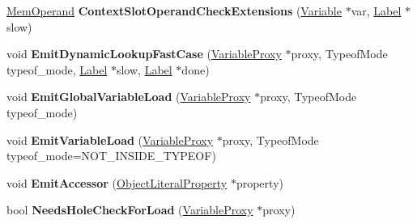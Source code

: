 \begin{DoxyCompactItemize}
\item 
\hyperlink{classv8_1_1internal_1_1_mem_operand}{Mem\+Operand} {\bfseries Context\+Slot\+Operand\+Check\+Extensions} (\hyperlink{classv8_1_1internal_1_1_variable}{Variable} $\ast$var, \hyperlink{classv8_1_1internal_1_1_label}{Label} $\ast$slow)\hypertarget{classv8_1_1internal_1_1_full_code_generator_a3c800aa5c15bc0a260f2b1cf37b70611}{}\label{classv8_1_1internal_1_1_full_code_generator_a3c800aa5c15bc0a260f2b1cf37b70611}

\item 
void {\bfseries Emit\+Dynamic\+Lookup\+Fast\+Case} (\hyperlink{classv8_1_1internal_1_1_variable_proxy}{Variable\+Proxy} $\ast$proxy, Typeof\+Mode typeof\+\_\+mode, \hyperlink{classv8_1_1internal_1_1_label}{Label} $\ast$slow, \hyperlink{classv8_1_1internal_1_1_label}{Label} $\ast$done)\hypertarget{classv8_1_1internal_1_1_full_code_generator_acdcff8f6aaade8779f0311528041bcc1}{}\label{classv8_1_1internal_1_1_full_code_generator_acdcff8f6aaade8779f0311528041bcc1}

\item 
void {\bfseries Emit\+Global\+Variable\+Load} (\hyperlink{classv8_1_1internal_1_1_variable_proxy}{Variable\+Proxy} $\ast$proxy, Typeof\+Mode typeof\+\_\+mode)\hypertarget{classv8_1_1internal_1_1_full_code_generator_aa137b9e0519c6f76eb461549ade8c3ef}{}\label{classv8_1_1internal_1_1_full_code_generator_aa137b9e0519c6f76eb461549ade8c3ef}

\item 
void {\bfseries Emit\+Variable\+Load} (\hyperlink{classv8_1_1internal_1_1_variable_proxy}{Variable\+Proxy} $\ast$proxy, Typeof\+Mode typeof\+\_\+mode=N\+O\+T\+\_\+\+I\+N\+S\+I\+D\+E\+\_\+\+T\+Y\+P\+E\+OF)\hypertarget{classv8_1_1internal_1_1_full_code_generator_a3a94cf14894e5a1443fb0c4f191f16f4}{}\label{classv8_1_1internal_1_1_full_code_generator_a3a94cf14894e5a1443fb0c4f191f16f4}

\item 
void {\bfseries Emit\+Accessor} (\hyperlink{classv8_1_1internal_1_1_object_literal_property}{Object\+Literal\+Property} $\ast$property)\hypertarget{classv8_1_1internal_1_1_full_code_generator_a6a4d022cd45cfd255f815bca78d04d0f}{}\label{classv8_1_1internal_1_1_full_code_generator_a6a4d022cd45cfd255f815bca78d04d0f}

\item 
bool {\bfseries Needs\+Hole\+Check\+For\+Load} (\hyperlink{classv8_1_1internal_1_1_variable_proxy}{Variable\+Proxy} $\ast$proxy)\hypertarget{classv8_1_1internal_1_1_full_code_generator_a6d047bce05fd5fe5c05a6f85da7f1604}{}\label{classv8_1_1internal_1_1_full_code_generator_a6d047bce05fd5fe5c05a6f85da7f1604}


\end{DoxyCompactItemize}

